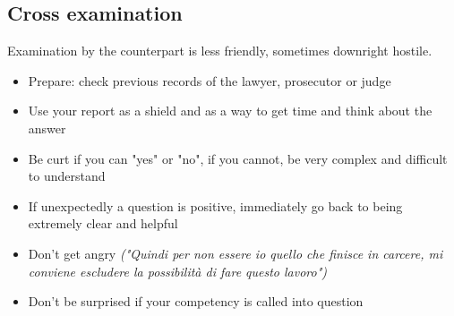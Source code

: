         \subsection{Cross examination}
            Examination by the counterpart is less friendly, sometimes downright hostile.
            \begin{itemize}
                \item Prepare: check previous records of the lawyer, prosecutor or judge
                \item Use your report as a shield and as a way to get time and think about the answer
                \item Be curt if you can "yes" or "no", if you cannot, be very complex and difficult to understand
                \item If unexpectedly a question is positive, immediately go back to being extremely clear and helpful
                \item Don't get angry \textit{("Quindi per non essere io quello che finisce in carcere, mi conviene escludere la possibilità di fare questo lavoro")}
                \item Don't be surprised if your competency is called into question
            \end{itemize}
        